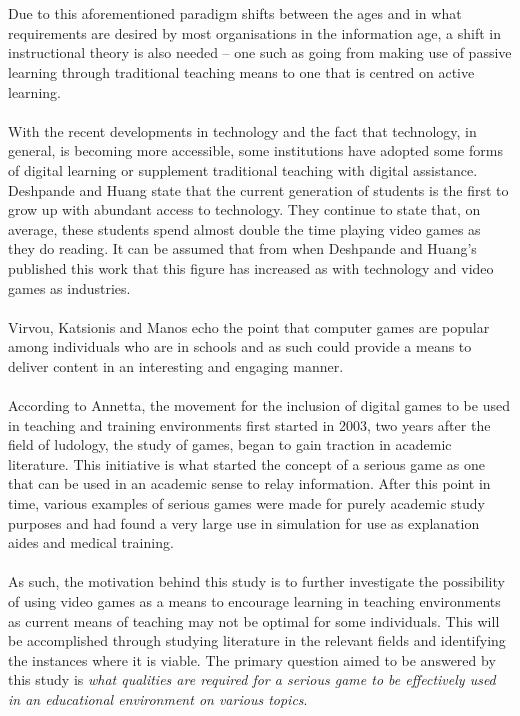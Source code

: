 \documentclass[conference]{IEEEtran}
\begin{document}
\\\\
Due to this aforementioned paradigm shifts between the ages and in what requirements are desired by most organisations in the information age, a shift in instructional theory is also needed – one such as going from making use of passive learning through traditional teaching means to one that is centred on active learning\cite{Reigeluth1996}.
\\\\
With the recent developments in technology and the fact that technology, in general, is becoming more accessible, some institutions have adopted some forms of digital learning or supplement traditional teaching with digital assistance. Deshpande and Huang\cite{Deshpande2011} state that the current generation of students is the first to grow up with abundant access to technology. They continue to state that, on average, these students spend almost double the time playing video games as they do reading\cite{Deshpande2011}. It can be assumed that from when Deshpande and Huang’s\cite{Deshpande2011} published this work that this figure has increased as with technology and video games as industries. 
\\\\
Virvou, Katsionis and Manos\cite{Virvou2005} echo the point that computer games are popular among individuals who are in schools and as such could provide a means to deliver content in an interesting and engaging manner. 
\\\\
According to Annetta\cite{Annetta2008}, the movement for the inclusion of digital games to be used in teaching and training environments first started in 2003, two years after the field of ludology, the study of games, began to gain traction in academic literature. This initiative is what started the concept of a serious game as one that can be used in an academic sense to relay information. After this point in time, various examples of serious games were made for purely academic study purposes and had found a very large use in simulation for use as explanation aides and medical training.
\\\\
As such, the motivation behind this study is to further investigate the possibility of using video games as a means to encourage learning in teaching environments as current means of teaching may not be optimal for some individuals. This will be accomplished through studying literature in the relevant fields and identifying the instances where it is viable. The primary question aimed to be answered by this study is \textit{what qualities are required for a serious game to be effectively used in an educational environment on various topics}.
 
\end{document}
